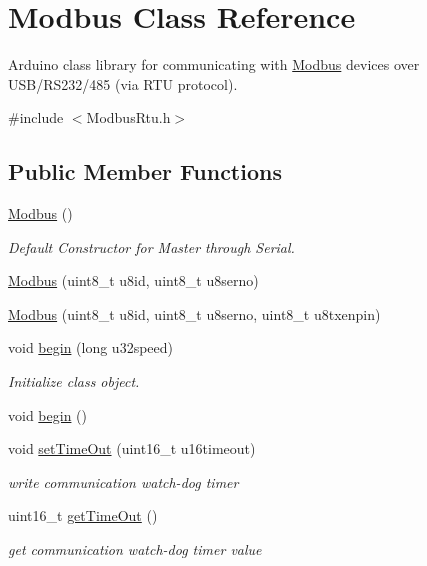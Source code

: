 \hypertarget{class_modbus}{\section{Modbus Class Reference}
\label{class_modbus}
}


Arduino class library for communicating with \hyperlink{class_modbus}{Modbus} devices over U\-S\-B/\-R\-S232/485 (via R\-T\-U protocol).  




{\ttfamily \#include $<$Modbus\-Rtu.\-h$>$}

\subsection*{Public Member Functions}
\begin{DoxyCompactItemize}
\item 
\hyperlink{group__setup_ga101809cdd4734537bab58dc315a840b4}{Modbus} ()
\begin{DoxyCompactList}\small\item\em Default Constructor for Master through Serial. \end{DoxyCompactList}\item 
\hyperlink{class_modbus_afbbf7c81565d8e1ea1cd5890a96e7507}{Modbus} (uint8\-\_\-t u8id, uint8\-\_\-t u8serno)
\item 
\hyperlink{class_modbus_a5e23a7b669d0c2d5be1c0054c7c54dca}{Modbus} (uint8\-\_\-t u8id, uint8\-\_\-t u8serno, uint8\-\_\-t u8txenpin)
\item 
void \hyperlink{group__setup_ga475a4fa0fac491307b10c4529ad6d2a0}{begin} (long u32speed)
\begin{DoxyCompactList}\small\item\em Initialize class object. \end{DoxyCompactList}\item 
void \hyperlink{class_modbus_a4f9673a3d113c49af69cb87b030ef099}{begin} ()
\item 
void \hyperlink{group__setup_gaf828190ebe24efb1b3b1957429f3872e}{set\-Time\-Out} (uint16\-\_\-t u16timeout)
\begin{DoxyCompactList}\small\item\em write communication watch-\/dog timer \end{DoxyCompactList}\item 
uint16\-\_\-t \hyperlink{class_modbus_ac860024db3117a2ef907d0325b2fb7a1}{get\-Time\-Out} ()
\begin{DoxyCompactList}\small\item\em get communication watch-\/dog timer value \end{DoxyCompactList}\item 

\end{DoxyCompactItemize}
